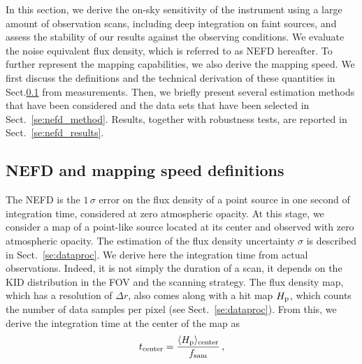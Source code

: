  
%

In this section, we derive the on-sky sensitivity of the instrument using a
large amount of observation scans, including deep integration on faint sources,
and assess the stability of our results against the observing
conditions.
We evaluate the noise equivalent flux density, which is referred to as
NEFD hereafter. To further represent the mapping capabilities, we also
derive the mapping speed.
We first discuss the definitions and the technical derivation of these quantities in
Sect.\ref{se:integration_time} from measurements. Then, we briefly present
several estimation methods that have been considered and the data sets that have
been selected in Sect.~\ref{se:nefd_method}. Results, together with robustness
tests, are reported in Sect.~\ref{se:nefd_results}.


\subsection{NEFD and mapping speed definitions}
\label{se:integration_time}

The NEFD is the $1\,\sigma$ error on the flux
density of a point source in one second of integration time,
considered at zero atmospheric opacity.
At this stage, we consider a map of a point-like source located at its
center and observed with zero atmospheric opacity. The estimation of
the flux density uncertainty $\sigma$ is described in Sect.~\ref{se:dataproc}.
We derive here the integration time from actual observations. Indeed,
it is not simply the duration of a scan, it depends on the KID
distribution in the FOV and the scanning strategy.
The flux density map, which has a resolution of $\Delta r$, also comes
along with a hit map $H_{\rm{p}}$, which counts the number of
data samples per pixel (see Sect.~\ref{se:dataproc}).
From this, we derive the integration time at the center
of the map as
\begin{equation}
t_{\rm{center}} = \frac{\langle H_{\rm{p}}\rangle_{\rm{center}}}{f_{\rm{sam}}}\,,
\end{equation}

